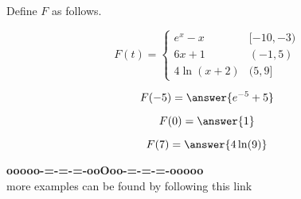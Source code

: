 \documentclass{ximera}
\begin{document}
\begin{example}

Define $F$ as follows.


\[
F(t) = 
\begin{cases}
  e^x - x   &    [-10, -3)     \\
  6x + 1  &    (-1, 5) \\
  4 \ln(x+2)    &    (5, 9]
\end{cases}
\]




\begin{question}

\[
F(-5) = \answer{e^{-5} + 5}
\]


\end{question}




\begin{question}

\[
F(0) = \answer{1}
\]


\end{question}






\begin{question}

\[
F(7) = \answer{4 \ln(9)}
\]


\end{question}




\end{example}


















\begin{center}
\textbf{\textcolor{green!50!black}{ooooo-=-=-=-ooOoo-=-=-=-ooooo}} \\

more examples can be found by following this link\\ 

\end{center}
\end{document}
